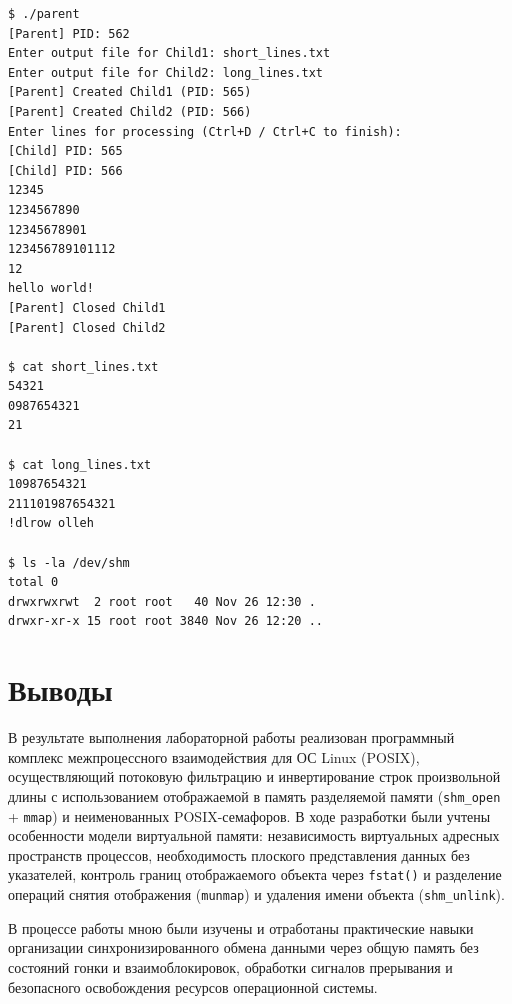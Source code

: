 \documentclass[11pt, a4paper]{article}
\begin{document}
\begin{lstlisting}
$ ./parent
[Parent] PID: 562
Enter output file for Child1: short_lines.txt
Enter output file for Child2: long_lines.txt
[Parent] Created Child1 (PID: 565)
[Parent] Created Child2 (PID: 566)
Enter lines for processing (Ctrl+D / Ctrl+C to finish): 
[Child] PID: 565
[Child] PID: 566
12345
1234567890
12345678901
123456789101112
12
hello world!
[Parent] Closed Child1
[Parent] Closed Child2

$ cat short_lines.txt
54321
0987654321
21

$ cat long_lines.txt
10987654321
211101987654321
!dlrow olleh

$ ls -la /dev/shm
total 0
drwxrwxrwt  2 root root   40 Nov 26 12:30 .
drwxr-xr-x 15 root root 3840 Nov 26 12:20 ..
\end{lstlisting}

\section{Выводы}
В результате выполнения лабораторной работы реализован программный комплекс межпроцессного взаимодействия для ОС Linux (POSIX), осуществляющий потоковую фильтрацию и инвертирование строк произвольной длины с использованием отображаемой в память разделяемой памяти (\texttt{shm\_open} + \texttt{mmap}) и неименованных POSIX-семафоров. В ходе разработки были учтены особенности модели виртуальной памяти: независимость виртуальных адресных пространств процессов, необходимость плоского представления данных без указателей, контроль границ отображаемого объекта через \texttt{fstat()} и разделение операций снятия отображения (\texttt{munmap}) и удаления имени объекта (\texttt{shm\_unlink}).

В процессе работы мною были изучены и отработаны практические навыки организации синхронизированного обмена данными через общую память без состояний гонки и взаимоблокировок, обработки сигналов прерывания и безопасного освобождения ресурсов операционной системы.
\end{document}
